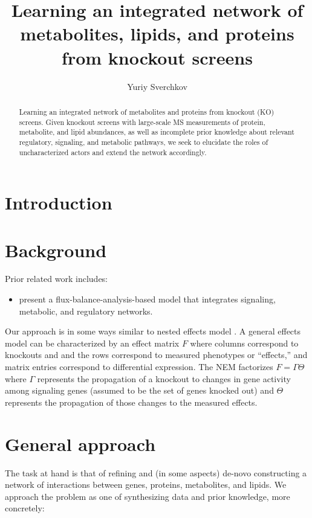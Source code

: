 \documentclass{article}
\title{Learning an integrated network of metabolites, lipids, and proteins from knockout screens}
\author{Yuriy Sverchkov}
\begin{document}
\maketitle

\begin{abstract}
Learning an integrated network of metabolites and proteins from knockout (KO) screens.
Given knockout screens with large-scale MS measurements of protein, metabolite, and lipid abundances, as well as incomplete prior knowledge about
relevant regulatory, signaling, and metabolic pathways, we seek to elucidate the roles of uncharacterized actors and extend the network accordingly.
\end{abstract}

\section{Introduction}


\section{Background}

Prior related work includes:
\begin{itemize}
 \item \textcite{lee2008dynamic} present a flux-balance-analysis-based model that integrates signaling, metabolic, and regulatory networks.
\end{itemize}

Our approach is in some ways similar to nested effects model \parencite{citation-needed}.
A general effects model can be characterized by an effect matrix $F$ where columns correspond to knockouts and and the rows correspond to measured phenotypes or ``effects,'' and matrix entries correspond to differential expression.
The NEM factorizes $F = \Gamma \Theta$ where $\Gamma$ represents the propagation of a knockout to changes in gene activity among signaling genes (assumed to be the set of genes knocked out) and $\Theta$ represents the propagation of those changes to the measured effects.

\section{General approach}

The task at hand is that of refining and (in some aspects) de-novo constructing a network of interactions between genes, proteins, metabolites, and lipids.
We approach the problem as one of synthesizing data and prior knowledge, more concretely:
\end{document}
